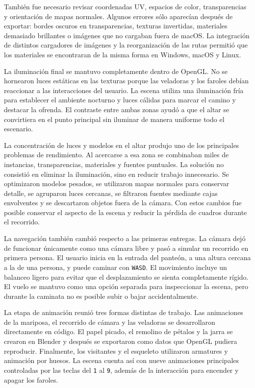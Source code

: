 \documentclass[letter,12pt]{article}
\begin{document}
También fue necesario revisar coordenadas UV, espacios de color, transparencias y orientación de mapas normales. Algunos errores sólo aparecían después de exportar: bordes oscuros en transparencias, texturas invertidas, materiales demasiado brillantes o imágenes que no cargaban fuera de macOS. La integración de distintos cargadores de imágenes y la reorganización de las rutas permitió que los materiales se encontraran de la misma forma en Windows, macOS y Linux.

La iluminación final se mantuvo completamente dentro de OpenGL. No se hornearon luces estáticas en las texturas porque las veladoras y los faroles debían reaccionar a las interacciones del usuario. La escena utiliza una iluminación fría para establecer el ambiente nocturno y luces cálidas para marcar el camino y destacar la ofrenda. El contraste entre ambas zonas ayudó a que el altar se convirtiera en el punto principal sin iluminar de manera uniforme todo el escenario.

La concentración de luces y modelos en el altar produjo uno de los principales problemas de rendimiento. Al acercarse a esa zona se combinaban miles de instancias, transparencias, materiales y fuentes puntuales. La solución no consistió en eliminar la iluminación, sino en reducir trabajo innecesario. Se optimizaron modelos pesados, se utilizaron mapas normales para conservar detalle, se agruparon luces cercanas, se filtraron fuentes mediante cajas envolventes y se descartaron objetos fuera de la cámara. Con estos cambios fue posible conservar el aspecto de la escena y reducir la pérdida de cuadros durante el recorrido.

La navegación también cambió respecto a las primeras entregas. La cámara dejó de funcionar únicamente como una cámara libre y pasó a simular un recorrido en primera persona. El usuario inicia en la entrada del panteón, a una altura cercana a la de una persona, y puede caminar con \texttt{WASD}. El movimiento incluye un balanceo ligero para evitar que el desplazamiento se sienta completamente rígido. El vuelo se mantuvo como una opción separada para inspeccionar la escena, pero durante la caminata no es posible subir o bajar accidentalmente.

La etapa de animación reunió tres formas distintas de trabajo. Las animaciones de la mariposa, el recorrido de cámara y las veladoras se desarrollaron directamente en código. El papel picado, el remolino de pétalos y la jarra se crearon en Blender y después se exportaron como datos que OpenGL pudiera reproducir. Finalmente, los visitantes y el esqueleto utilizaron armatures y animación por huesos. La escena cuenta así con nueve animaciones principales controladas por las teclas del \texttt{1} al \texttt{9}, además de la interacción para encender y apagar los faroles.
\end{document}
